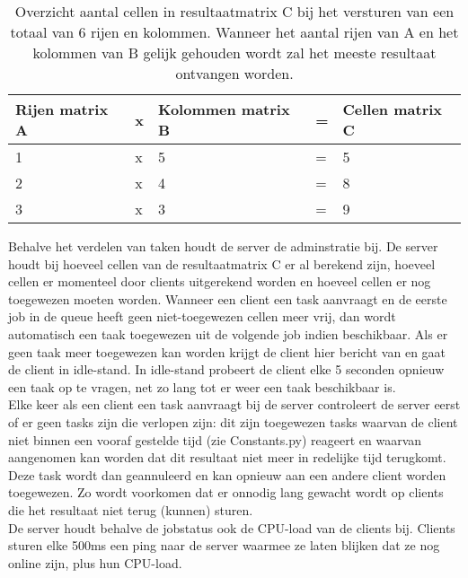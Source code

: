 \documentclass[11pt]{article}
\begin{document}
\begin{table}[H]
    \begin{tabular}{|ll|lll}
    \hline
    Rijen matrix A & x & Kolommen matrix B & = & Cellen matrix C \\ \hline
    1              & x & 5                 & = & 5               \\
    2              & x & 4                 & = & 8               \\
    3              & x & 3                 & = & 9               \\ \hline
    \end{tabular}
    \caption{Overzicht aantal cellen in resultaatmatrix C bij het versturen van een totaal van 6 
    rijen en kolommen. Wanneer het aantal rijen van A en het kolommen van B gelijk gehouden wordt
    zal het meeste resultaat ontvangen worden.}
\end{table}

Behalve het verdelen van taken houdt de server de adminstratie bij. De server houdt bij hoeveel
cellen van de resultaatmatrix C er al berekend zijn, hoeveel cellen er momenteel door clients
uitgerekend worden en hoeveel cellen er nog toegewezen moeten worden. Wanneer een client een
task aanvraagt en de eerste job in de queue heeft geen niet-toegewezen cellen meer vrij, dan
wordt automatisch een taak toegewezen uit de volgende job indien beschikbaar. Als er geen taak
meer toegewezen kan worden krijgt de client hier bericht van en gaat de client in idle-stand.
In idle-stand probeert de client elke 5 seconden opnieuw een taak op te vragen, net zo lang tot
er weer een taak beschikbaar is.\\
Elke keer als een client een task aanvraagt bij de server controleert de server eerst of er geen
tasks zijn die verlopen zijn: dit zijn toegewezen tasks waarvan de client niet binnen een vooraf
gestelde tijd (zie Constants.py) reageert en waarvan aangenomen kan worden dat dit resultaat niet
meer in redelijke tijd terugkomt. Deze task wordt dan geannuleerd en kan opnieuw aan een andere
client worden toegewezen. Zo wordt voorkomen dat er onnodig lang gewacht wordt op clients die
het resultaat niet terug (kunnen) sturen.\\
De server houdt behalve de jobstatus ook de CPU-load van de clients bij. Clients sturen elke
500ms een ping naar de server waarmee ze laten blijken dat ze nog online zijn, plus hun CPU-load.
\end{document}
